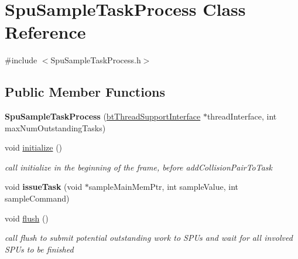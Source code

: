 \hypertarget{classSpuSampleTaskProcess}{}\section{Spu\+Sample\+Task\+Process Class Reference}
\label{classSpuSampleTaskProcess}


{\ttfamily \#include $<$Spu\+Sample\+Task\+Process.\+h$>$}

\subsection*{Public Member Functions}
\begin{DoxyCompactItemize}
\item 
\mbox{\label{classSpuSampleTaskProcess_a8144853118a2787f3ebd8986ef07249f}} 
{\bfseries Spu\+Sample\+Task\+Process} (\hyperlink{classbtThreadSupportInterface}{bt\+Thread\+Support\+Interface} $\ast$thread\+Interface, int max\+Num\+Outstanding\+Tasks)
\item 
\mbox{\label{classSpuSampleTaskProcess_a955dfb43d04179a0caef12dd9d339ebb}} 
void \hyperlink{classSpuSampleTaskProcess_a955dfb43d04179a0caef12dd9d339ebb}{initialize} ()
\begin{DoxyCompactList}\small\item\em call initialize in the beginning of the frame, before add\+Collision\+Pair\+To\+Task \end{DoxyCompactList}\item 
\mbox{\label{classSpuSampleTaskProcess_a2f9d210a42b8bd17d5a118c36fa57a38}} 
void {\bfseries issue\+Task} (void $\ast$sample\+Main\+Mem\+Ptr, int sample\+Value, int sample\+Command)
\item 
\mbox{\label{classSpuSampleTaskProcess_ad9804e89ae7a0a54c0d43bebd13f3cb9}} 
void \hyperlink{classSpuSampleTaskProcess_ad9804e89ae7a0a54c0d43bebd13f3cb9}{flush} ()
\begin{DoxyCompactList}\small\item\em call flush to submit potential outstanding work to S\+P\+Us and wait for all involved S\+P\+Us to be finished \end{DoxyCompactList}\item 
\mbox{\label{classSpuSampleTaskProcess_a8144853118a2787f3ebd8986ef07249f}} 

\end{DoxyCompactItemize}
